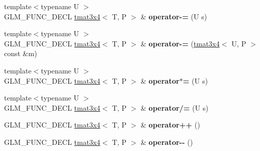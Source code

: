 \begin{DoxyCompactItemize}
\item 
\hypertarget{structglm_1_1detail_1_1tmat3x4_a9bfae7f6a40560de9392ba57cd2edff5}{{\footnotesize template$<$typename U $>$ }\\G\-L\-M\-\_\-\-F\-U\-N\-C\-\_\-\-D\-E\-C\-L \hyperlink{structglm_1_1detail_1_1tmat3x4}{tmat3x4}$<$ T, P $>$ \& {\bfseries operator-\/=} (U s)}\label{structglm_1_1detail_1_1tmat3x4_a9bfae7f6a40560de9392ba57cd2edff5}

\item 
\hypertarget{structglm_1_1detail_1_1tmat3x4_aa8d0e590eec95fd09194f038dd349e34}{{\footnotesize template$<$typename U $>$ }\\G\-L\-M\-\_\-\-F\-U\-N\-C\-\_\-\-D\-E\-C\-L \hyperlink{structglm_1_1detail_1_1tmat3x4}{tmat3x4}$<$ T, P $>$ \& {\bfseries operator-\/=} (\hyperlink{structglm_1_1detail_1_1tmat3x4}{tmat3x4}$<$ U, P $>$ const \&m)}\label{structglm_1_1detail_1_1tmat3x4_aa8d0e590eec95fd09194f038dd349e34}

\item 
\hypertarget{structglm_1_1detail_1_1tmat3x4_ab07ee1da7bbf72d894107d5ea90b4b50}{{\footnotesize template$<$typename U $>$ }\\G\-L\-M\-\_\-\-F\-U\-N\-C\-\_\-\-D\-E\-C\-L \hyperlink{structglm_1_1detail_1_1tmat3x4}{tmat3x4}$<$ T, P $>$ \& {\bfseries operator$\ast$=} (U s)}\label{structglm_1_1detail_1_1tmat3x4_ab07ee1da7bbf72d894107d5ea90b4b50}

\item 
\hypertarget{structglm_1_1detail_1_1tmat3x4_a0fa10e45cfa4cee78245916ac325150e}{{\footnotesize template$<$typename U $>$ }\\G\-L\-M\-\_\-\-F\-U\-N\-C\-\_\-\-D\-E\-C\-L \hyperlink{structglm_1_1detail_1_1tmat3x4}{tmat3x4}$<$ T, P $>$ \& {\bfseries operator/=} (U s)}\label{structglm_1_1detail_1_1tmat3x4_a0fa10e45cfa4cee78245916ac325150e}

\item 
\hypertarget{structglm_1_1detail_1_1tmat3x4_a26b88699223e57ea3523a51f76e00dba}{G\-L\-M\-\_\-\-F\-U\-N\-C\-\_\-\-D\-E\-C\-L \hyperlink{structglm_1_1detail_1_1tmat3x4}{tmat3x4}$<$ T, P $>$ \& {\bfseries operator++} ()}\label{structglm_1_1detail_1_1tmat3x4_a26b88699223e57ea3523a51f76e00dba}

\item 
\hypertarget{structglm_1_1detail_1_1tmat3x4_a0537b06d951dd3e6ea5da5c6cd1dc1e5}{G\-L\-M\-\_\-\-F\-U\-N\-C\-\_\-\-D\-E\-C\-L \hyperlink{structglm_1_1detail_1_1tmat3x4}{tmat3x4}$<$ T, P $>$ \& {\bfseries operator-\/-\/} ()}\label{structglm_1_1detail_1_1tmat3x4_a0537b06d951dd3e6ea5da5c6cd1dc1e5}


\end{DoxyCompactItemize}
